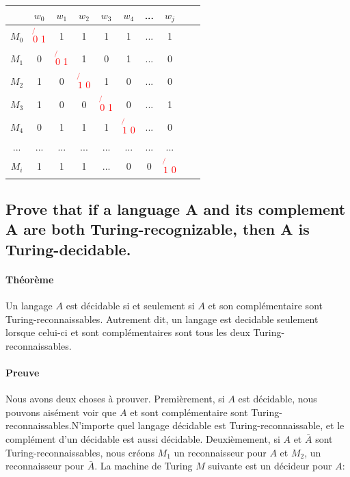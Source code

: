 \begin{center}
\begin{tabular}{| c | c | c | c | c | c | c | c | c | c |}
	\hline
          & $w_0$ & $w_1$ & $w_2$ & $w_3$ & $w_4$ & ... & $w_j$ \\
    \hline
    $M_0$ & \textcolor{red}{$\not{0}$ 1}     & 1     & 1     & 1     & 1     & ... & 1     \\
    \hline
    $M_1$ & 0     & \textcolor{red}{$\not{0}$ 1}     & 1     & 0     & 1     & ... & 0     \\
    \hline
    $M_2$ & 1     & 0     & \textcolor{red}{$\not{1}$ 0}     & 1     & 0     & ... & 0     \\
    \hline
    $M_3$ & 1	  & 0     & 0     & \textcolor{red}{$\not{0}$ 1}     & 0     & ... & 1     \\
    \hline
    $M_4$ & 0     & 1     & 1     & 1     & \textcolor{red}{$\not{1}$ 0}     & ... & 0     \\
    \hline
    $...$ & ...   & ...   & ...   & ...   & ...   & ... & ...   \\
    \hline
    $M_i$ & 1     & 1     & 1     & ...   & 0     & 0   & \textcolor{red}{$\not{1}$ 0}     \\
\end{tabular}
\end{center}


\subsection{ Prove that if a language A and its complement A are both Turing-recognizable, then A is Turing-decidable. }
\paragraph{Théorème} Un langage $A$ est décidable si et seulement si $A$ et son complémentaire sont Turing-reconnaissables. Autrement dit, un langage est decidable seulement lorsque celui-ci et sont complémentaires sont tous les deux Turing-reconnaissables.

\paragraph{Preuve} Nous avons deux choses à prouver. Premièrement, si $A$ est décidable, nous pouvons aisément voir que $A$ et sont complémentaire sont Turing-reconnaissables.N'importe quel langage décidable est Turing-reconnaissable, et le complément d'un décidable est aussi décidable. Deuxièmement, si $A$ et $\bar{A}$ sont Turing-reconnaissables, nous créons $M_{1}$ un reconnaisseur pour $A$ et $M_{2}$, un reconnaisseur pour $\bar{A}$.  La machine de Turing $M$ suivante est un décideur pour $A$: 
